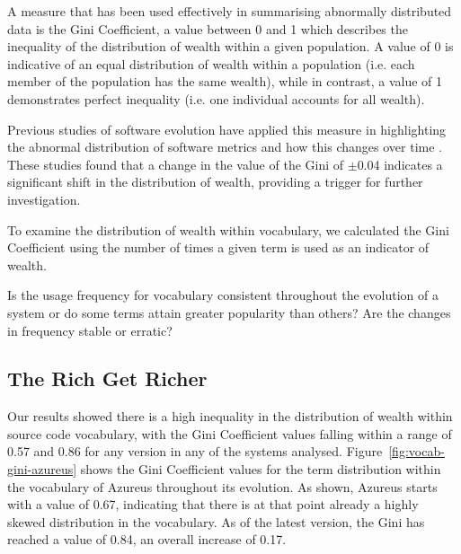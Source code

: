 A measure that has been used effectively in summarising abnormally distributed data is the Gini Coefficient, a value between 0 and 1 which describes the inequality of the distribution of wealth within a given population. A value of 0 is indicative of an equal distribution of wealth within a population (i.e. each member of the population has the same wealth), while in contrast, a value of 1 demonstrates perfect inequality (i.e. one individual accounts for all wealth).


Previous studies of software evolution have applied this measure in highlighting the abnormal distribution of software metrics and how this changes over time \cite{Vasa09a}. These studies found that a change in the value of the Gini of $\pm$0.04 indicates a significant shift in the distribution of wealth, providing a trigger for further investigation. 

To examine the distribution of wealth within vocabulary, we calculated the Gini Coefficient using the number of times a given term is used as an indicator of wealth.

Is the usage frequency for vocabulary consistent throughout the evolution of a system or do some terms attain greater popularity than others? Are the changes in frequency stable or erratic?

% 
% 
% 
% 


\subsection{The Rich Get Richer} %
\label{sub:the_rich_get_richer}

Our results showed there is a high inequality in the distribution of wealth within source code vocabulary, with the Gini Coefficient values falling within a range of 0.57 and 0.86 for any version in any of the systems analysed. Figure~\ref{fig:vocab-gini-azureus} shows the Gini Coefficient values for the term distribution within the vocabulary of Azureus throughout its evolution. As shown, Azureus starts with a value of 0.67, indicating that there is at that point already a highly skewed distribution in the vocabulary. As of the latest version, the Gini has reached a value of 0.84, an overall increase of 0.17.

